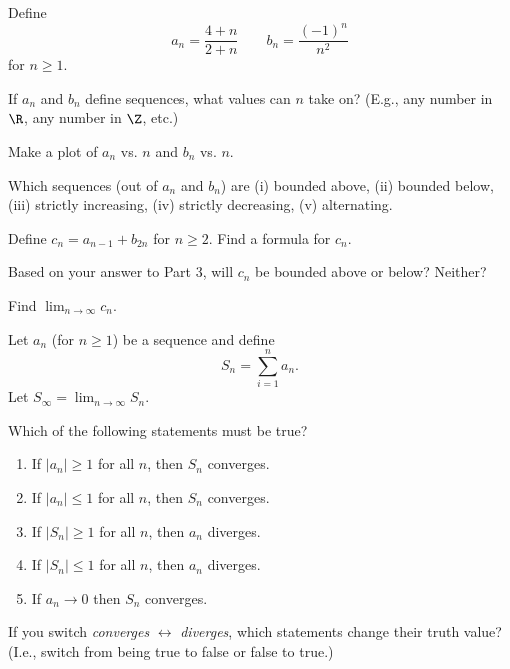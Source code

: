 \documentclass{workbook}
\begin{document}
\begin{slide}
	\question
	Define \[
		a_n = \frac{4+n}{2+n} \qquad b_n = \frac{(-1)^n}{n^2}
	\]
	for $n\geq 1$.

	\begin{parts}
		\item If $a_n$ and $b_n$ define sequences, what values can $n$ take on? (E.g., any number in $\R$, any number in $\Z$, etc.)
		\item Make a plot of $a_n$ vs. $n$ and $b_n$ vs. $n$.
		\item Which sequences (out of $a_n$ and $b_n$) are (i) bounded above, (ii) bounded below,
		(iii) strictly increasing, (iv) strictly decreasing, (v) alternating.

		\item Define $c_n=a_{n-1} + b_{2n}$ for $n\geq 2$. Find a formula for $c_n$.

		\item Based on your answer to Part 3, will $c_n$ be bounded above or below?	Neither?

		\item Find $\displaystyle \lim_{n\to\infty} c_n$.
	\end{parts}
\end{slide}

\begin{slide}
	\question
	Let $a_n$ (for $n\geq 1$) be a sequence and define
	\[
		S_n = \sum_{i=1}^n a_n.
	\]
	Let $S_\infty = \lim_{n\to\infty } S_n$.

	\begin{parts}
		\parbox{\textwidth}{
			\item Which of the following statements must be true?

			\begin{enumerate}
				\item If $|a_n| \geq 1$ for all $n$, then $S_n$ converges.
				\item If $|a_n| \leq 1$ for all $n$, then $S_n$ converges.
				\item If $|S_n| \geq 1$ for all $n$, then $a_n$ diverges.
				\item If $|S_n| \leq 1$ for all $n$, then $a_n$ diverges.
				\item If $a_n\to 0$ then $S_n$ converges.

			\end{enumerate}
		}

		\bigskip
		\bigskip
		\item If you switch \emph{converges} $\leftrightarrow$ \emph{diverges},
		which statements change their truth value? (I.e., switch from being true to false or
		false to true.)
	\end{parts}
\end{slide}
\end{document}
